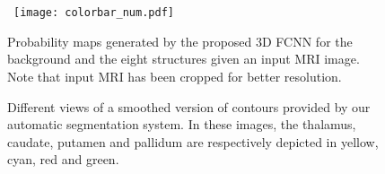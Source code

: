 \documentclass[twoside,fleqn,espcrc2]{elsarticle}
\begin{document}
\begin{figure}[ht!]
\begin{small}
     \begin{center}

        \mbox{
        }\\ %

        \vspace{1mm}

        \mbox{
        }\\

        \vspace{1mm}

        \mbox{
            \texttt{[image: colorbar\_num.pdf]}
        }
    \end{center}
    \end{small}
    \caption{Probability maps generated by the proposed 3D FCNN for the background and the eight structures given an input MRI image. Note that input MRI has been cropped for better resolution.}%
   \label{fig:probMaps}
\end{figure}


\begin{figure}[ht!]
     \begin{center}

        \caption{Different views of a smoothed version of contours provided by our automatic segmentation system. In these images, the thalamus, caudate, putamen and pallidum are respectively depicted in yellow, cyan, red and green.}
        \label{fig:3D}
\end{center}
\end{figure}
\end{document}
